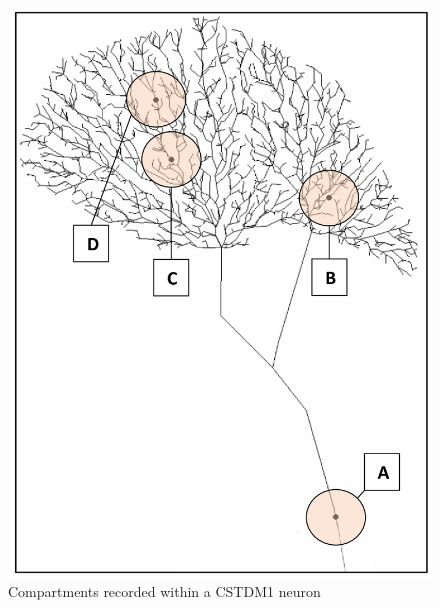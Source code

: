 \documentclass[a4paper,11pt]{article}
\begin{document}
\begin{figure}[H]
\centering
\includegraphics[scale=0.5]{cstmd_neuron}
\caption{Compartments recorded within a CSTDM1 neuron}
\end{figure}
\end{document}
